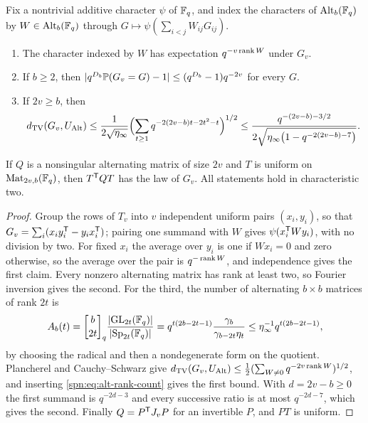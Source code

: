 \begin{lemma}\label{spn:lem:alt-gram}
Fix a nontrivial additive character $\psi$ of $\mathbb{F}_q$, and index the characters of
$\operatorname{Alt}_b(\mathbb{F}_q)$ by $W\in\operatorname{Alt}_b(\mathbb{F}_q)$ through $G\mapsto\psi(\sum_{i<j}W_{ij}G_{ij})$.
\begin{enumerate}
\item The character indexed by $W$ has expectation $q^{-v\operatorname{rank} W}$ under $G_v$.
\item If $b\ge2$, then $\lvert q^{D_b}\mathbb{P}(G_v=G)-1\rvert\le(q^{D_b}-1)q^{-2v}$ for every $G$.
\item If $2v\ge b$, then
\[
 d_{\mathrm{TV}}(G_v,U_{\operatorname{Alt}})\le\frac{1}{2\sqrt{\eta_\infty}}
 \Bigl(\sum_{t\ge1}q^{-2(2v-b)t-2t^2-t}\Bigr)^{1/2}
 \le\frac{q^{-(2v-b)-3/2}}{2\sqrt{\eta_\infty\bigl(1-q^{-2(2v-b)-7}\bigr)}} .
\]
\end{enumerate}
If $Q$ is a nonsingular alternating matrix of size $2v$ and $T$ is uniform on
$\operatorname{Mat}_{2v,b}(\mathbb{F}_q)$, then $T^{\mathsf{T}}QT$ has the law of $G_v$. All statements hold in
characteristic two.
\end{lemma}

\begin{proof}
Group the rows of $T_v$ into $v$ independent uniform pairs $(x_i,y_i)$, so that
$G_v=\sum_i(x_iy_i^{\mathsf{T}}-y_ix_i^{\mathsf{T}})$; pairing one summand with $W$ gives
$\psi(x_i^{\mathsf{T}}Wy_i)$, with no division by two. For fixed $x_i$ the average over $y_i$ is one
if $Wx_i=0$ and zero otherwise, so the average over the pair is $q^{-\operatorname{rank} W}$, and
independence gives the first claim. Every nonzero alternating matrix has rank at least two, so
Fourier inversion gives the second. For the third, the number of alternating $b\times b$
matrices of rank $2t$ is
\begin{equation}\label{spn:eq:alt-rank-count}
 A_b(t)=\spnqbin{b}{2t}{q}\frac{\abs{\GL_{2t}(\F_q)}}{\abs{\Sp_{2t}(\F_q)}}
 =q^{t(2b-2t-1)}\frac{\gamma_b}{\gamma_{b-2t}\eta_t}\le\eta_\infty^{-1}q^{t(2b-2t-1)},
\end{equation}
by choosing the radical and then a nondegenerate form on the quotient. Plancherel and
Cauchy--Schwarz give
$d_{\mathrm{TV}}(G_v,U_{\operatorname{Alt}})\le\frac12(\sum_{W\ne0}q^{-2v\operatorname{rank} W})^{1/2}$, and inserting
\eqref{spn:eq:alt-rank-count} gives the first bound. With $d=2v-b\ge0$ the first summand is
$q^{-2d-3}$ and every successive ratio is at most $q^{-2d-7}$, which gives the second. Finally
$Q=P^{\mathsf{T}}J_vP$ for an invertible $P$, and $PT$ is uniform.
\end{proof}

